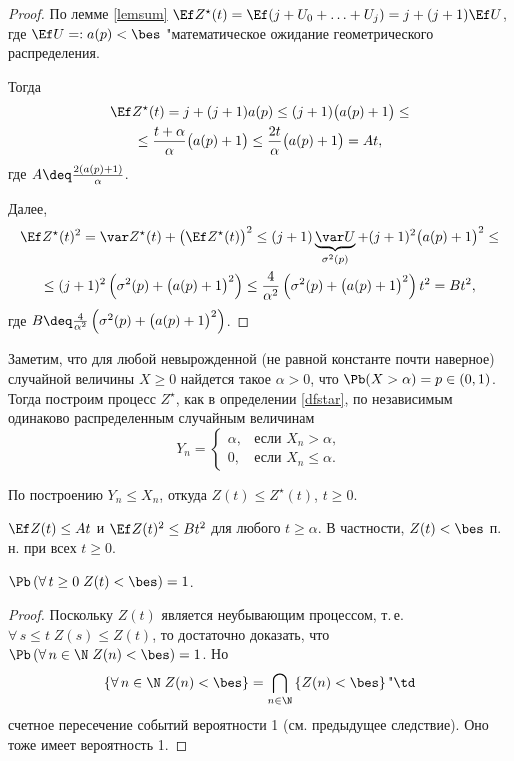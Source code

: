 \begin{proof}
	По лемме \ref{lemsum} $\Ef Z^\star(t) = \Ef(j + U_0 + \ldots + U_j) = j + (j + 1) \Ef U$, где $\Ef U =: a(p) < \bes$ "\td математическое ожидание геометрического распределения.

	Тогда
	\begin{multline*}
		\Ef Z^\star(t) = j + (j + 1) a(p) \le (j + 1) \big(a(p) + 1\big) \le\\
		\le \frac{t + \alpha}{\alpha} \big(a(p) + 1\big) \le \frac{2 t}{\alpha} \big( a(p) + 1 \big) = A t,
	\end{multline*}
	где $A \deq \frac{2 (a(p) + 1)}{\alpha}$.

	Далее,
	\begin{multline*}
		\Ef Z^\star(t)^2 = \var Z^\star(t) + \big(\Ef Z^\star(t) \big)^2 \le (j + 1) \underbrace{\var U}_{\sigma^2(p)} + (j + 1)^2 \big( a(p) + 1 \big)^2 \le\\
		\le (j + 1)^2 \left( \sigma^2(p) + \big( a(p) + 1 \big)^2 \right) \le \frac{4}{\alpha^2} \left( \sigma^2(p) + \big( a(p) + 1 \big)^2 \right) t^2 = B t^2,
	\end{multline*}
	где $B \deq \frac{4}{\alpha^2} \left( \sigma^2(p) + \big( a(p) + 1 \big)^2 \right)$.
\end{proof}

Заметим, что для любой невырожденной (не равной константе почти наверное) случайной величины $X \ge 0$ найдется такое $\alpha > 0$, что $\Pb(X > \alpha) = p \in (0, 1)$.
Тогда построим процесс $Z^\star$, как в определении \ref{dfstar}, по независимым одинаково распределенным случайным величинам
$$
	Y_n =
	\begin{cases}
		\alpha, &\text{если }X_n > \alpha,\\
		0, &\text{если }X_n \le \alpha.
	\end{cases}
$$

По построению $Y_n \le X_n$, откуда $Z(t) \le Z^\star(t)$, $t \ge 0$.

\begin{cor}
	$\Ef Z(t) \le A t$ и $\Ef Z(t)^2 \le B t^2$ для любого $t \ge \alpha$.
В частности, $Z(t) < \bes$ п.\,н.
при всех $t \ge 0$.
\end{cor}

\begin{cor}
	$\Pb\left( \forall\, t \ge 0\; Z(t) < \bes \right) = 1$.
\end{cor}

\begin{proof}
	Поскольку $Z(t)$ является неубывающим процессом, т.\,е.
$\forall\, s \le t \; Z(s) \le Z(t)$, то достаточно доказать, что $\Pb\left(\forall\,n \in \N\; Z(n) < \bes\right) = 1$.
Но
	$$
		\left\{ \forall\,n \in \N\; Z(n) < \bes \right\} = \bigcap_{n \in \N} \left\{ Z(n) < \bes \right\} \text{"\td}
	$$
	счетное пересечение событий вероятности 1 (см.
предыдущее следствие).
Оно тоже имеет вероятность 1.
\end{proof}


